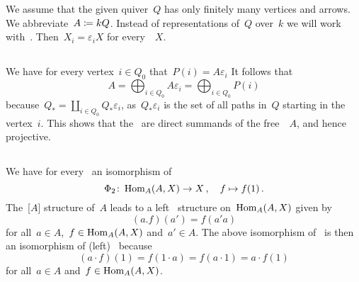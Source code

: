 \section{}

We assume that the given quiver~$Q$ has only finitely many vertices and arrows.
We abbreviate~$A \coloneqq kQ$.
Instead of representations of~$Q$ over~$k$ we will work with~{}.
Then~$X_i = \varepsilon_i X$ for every~{}~$X$.





\addtocounter{subsection}{1}





\subsection{}

We have for every vertex~$i \in Q_0$ that~$P(i) = A \varepsilon_i$
It follows that
\[
    A
  = \bigoplus_{i \in Q_0} A \varepsilon_i
  = \bigoplus_{i \in Q_0} P(i)
\]
because~$Q_* = \coprod_{i \in Q_0} Q_* \varepsilon_i$, as~$Q_* \varepsilon_i$ is the set of all paths in~$Q$ starting in the vertex~$i$.
This shows that the~{} are direct summands of the free~{}~$A$, and hence projective.





\addtocounter{subsection}{-2}
\subsection{}

We have for every~{} an isomorphism of~{\kvss}
\[
  \Phi_2
  \colon
  \operatorname{Hom}_A(A, X)
  \to
  X \,,
  \quad
  f
  \mapsto
  f(1) \,.
\]
The~{[$A$]} structure of~$A$ leads to a left~{} structure on~$\operatorname{Hom}_A(A,X)$ given by
\[
    (a.f)(a')
  = f(a'a)
\]
for all~$a \in A$,~$f \in \operatorname{Hom}_A(A,X)$ and~$a' \in A$.
The above isomorphism of~{\kvs} is then an isomorphism of (left)~{} because
\[
    (a \cdot f)(1)
  = f(1 \cdot a)
  = f(a \cdot 1)
  = a \cdot f(1)
\]
for all~$a \in A$ and~$f \in \operatorname{Hom}_A(A,X)$.

